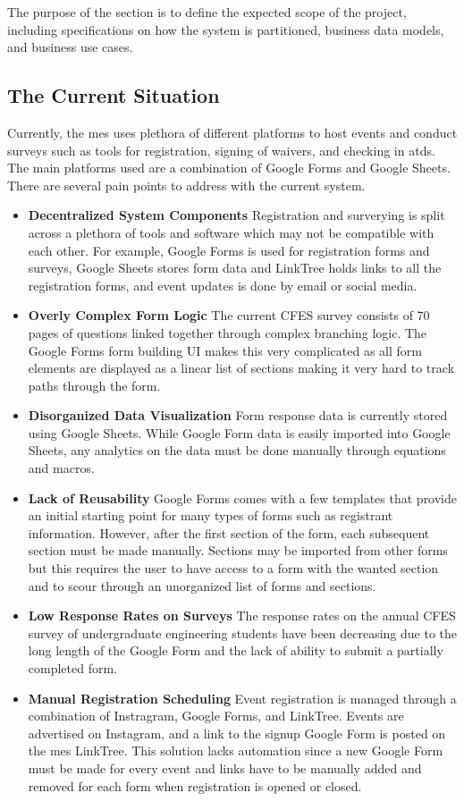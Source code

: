 \documentclass[12pt]{article}
\begin{document}
The purpose of the section is to define the expected scope of the project, including specifications on how the system is partitioned, business data models, and business use cases.

\subsection{The Current Situation}

Currently, the \gls{mes} uses plethora of different platforms to host events and conduct surveys such as tools for registration, signing of waivers, and checking in \glspl{atd}. The main platforms used are a combination of Google Forms and Google Sheets. There are several pain points to address with the current system.

\begin{itemize}
  \item \textbf{Decentralized System Components} Registration and surverying is split across a plethora of tools and software which may not be compatible with each other. For example, Google Forms is used for registration forms and surveys, Google Sheets stores form data and LinkTree holds links to all the registration forms, and event updates is done by email or social media.
  \item \textbf{Overly Complex Form Logic} The current CFES survey consists of 70 pages of questions linked together through complex branching logic. The Google Forms form building UI makes this very complicated as all form elements are displayed as a linear list of sections making it very hard to track paths through the form.
  \item \textbf{Disorganized Data Visualization} Form response data is currently stored using Google Sheets. While Google Form data is easily imported into Google Sheets, any analytics on the data must be done manually through equations and macros.
  \item \textbf{Lack of Reusability} Google Forms comes with a few templates that provide an initial starting point for many types of forms such as registrant information. However, after the first section of the form, each subsequent section must be made manually. Sections may be imported from other forms but this requires the user to have access to a form with the wanted section and to scour through an unorganized list of forms and sections.
  \item \textbf{Low Response Rates on Surveys} The response rates on the annual CFES survey of undergraduate engineering students have been decreasing due to the long length of the Google Form and the lack of ability to submit a partially completed form.
  \item \textbf{Manual Registration Scheduling} Event registration is managed through a combination of Instragram, Google Forms, and LinkTree. Events are advertised on Instagram, and a link to the signup Google Form is posted on the \gls{mes} LinkTree. This solution lacks automation since a new Google Form must be made for every event and links have to be manually added and removed for each form when registration is opened or closed.
\end{itemize}
\end{document}
